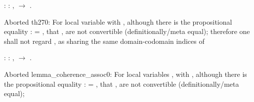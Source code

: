 \coqdocemptyline
\begin{coqdoccode}
\coqdocemptyline
\coqdocnoindent
{}  : \coqdockw{\ensuremath{\forall}}  : ,   \ensuremath{\rightarrow}   \coqdocnotation{=} .\coqdoceol
\end{coqdoccode}
Aborted th270: For local variable  with  ,
although there is the propositional equality :   = ,
that  ,  are not convertible (definitionally/meta equal);
therefore one shall not regard ,   as sharing
the same domain-codomain indices of  \begin{coqdoccode}
\coqdocemptyline
\coqdocemptyline
\coqdocnoindent
{}  : \coqdockw{\ensuremath{\forall}}   : ,    \ensuremath{\rightarrow}   \coqdocnotation{=}  .\coqdoceol
\end{coqdoccode}
Aborted lemma\_coherence\_assoc0: For local variables ,  with   ,
although there is the propositional equality :   =  ,
that  ,   are not convertible (definitionally/meta equal);
